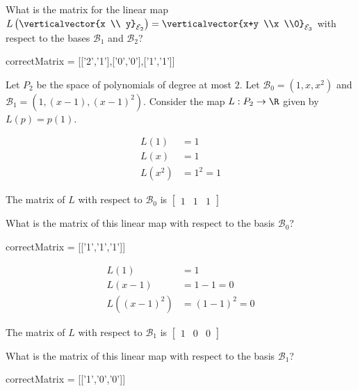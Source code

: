 \documentclass{ximera}
\begin{document}
\begin{question}
\begin{solution}
    What is the matrix for the linear map $L\left(\verticalvector{x \\ y}_{\mathcal{E}_2}\right) = \verticalvector{x+y \\x \\0}_{\mathcal{E}_3}$ with respect to the 
    bases $\mathcal{B}_1$  and $\mathcal{B}_2$?

    \begin{matrix-answer}
      correctMatrix = [['2','1'],['0','0'],['1','1']]
    \end{matrix-answer}
  \end{solution}
\end{question}

\begin{question}
  Let $P_2$ be the space of polynomials of degree at most $2$.  Let $\mathcal{B}_0 = (1,x,x^2)$ and $\mathcal{B}_1 = (1,(x-1),(x-1)^2)$.  
  Consider the map $L:P_2 \to \R$ given by $L(p) = p(1)$.  
  \begin{solution}
    \begin{hint}
      \begin{align*}
        L(1) &= 1\\
        L(x) &= 1\\
        L(x^2)&=1^2=1
      \end{align*}
    \end{hint}
    \begin{hint}
        The matrix of $L$ with respect to $\mathcal{B}_0$ is \( \begin{bmatrix} 1&1&1 \end{bmatrix}\)
    \end{hint}
    What is the matrix of this linear map with respect to the basis $\mathcal{B}_0$?  
    \begin{matrix-answer}
      correctMatrix = [['1','1','1']]
    \end{matrix-answer}
  \end{solution}
  
  \begin{solution}
    \begin{hint}
      \begin{align*}
        L(1) &= 1\\
        L(x-1) &= 1-1=0\\
        L((x-1)^2)&=(1-1)^2=0
      \end{align*}
    \end{hint}
    \begin{hint}
        The matrix of $L$ with respect to $\mathcal{B}_1$ is \( \begin{bmatrix} 1&0&0 \end{bmatrix}\)
    \end{hint}
    What is the matrix of this linear map with respect to the basis $\mathcal{B}_1$?  
    
    \begin{matrix-answer}
      correctMatrix = [['1','0','0']]
    \end{matrix-answer}
  \end{solution}
\end{question}
\end{document}
